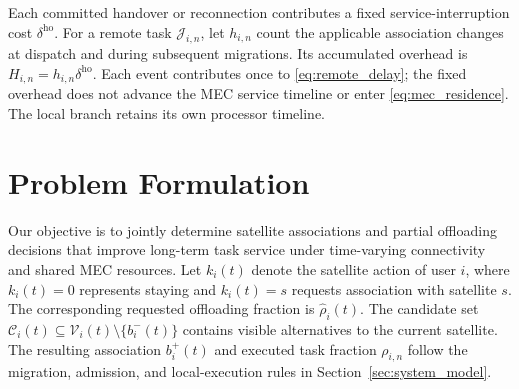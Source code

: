 \documentclass[journal]{IEEEtran}
\begin{document}
Each committed handover or reconnection contributes
a fixed service-interruption cost $\delta^{\mathrm{ho}}$.
For a remote task $\mathcal{J}_{i,n}$, let $h_{i,n}$
count the applicable association changes at dispatch
and during subsequent migrations. Its accumulated
overhead is $H_{i,n}=h_{i,n}\delta^{\mathrm{ho}}$.
Each event contributes once to \eqref{eq:remote_delay};
the fixed overhead does not advance the MEC service
timeline or enter \eqref{eq:mec_residence}.
The local branch retains its own processor timeline.

\section{Problem Formulation}
\label{sec:problem_formulation}

Our objective is to jointly determine satellite associations
and partial offloading decisions that improve long-term task
service under time-varying connectivity and shared MEC
resources. Let $k_i(t)$ denote the satellite action of user
$i$, where $k_i(t)=0$ represents staying and
$k_i(t)=s$ requests association with satellite $s$.
The corresponding requested offloading fraction is
$\widehat{\rho}_i(t)$.
The candidate set
$\mathcal{C}_i(t)\subseteq
\mathcal{V}_i(t)\setminus\{b_i^{-}(t)\}$
contains visible alternatives to the current satellite.
The resulting association $b_i^{+}(t)$ and executed task
fraction $\rho_{i,n}$ follow the migration, admission,
and local-execution rules in Section~\ref{sec:system_model}.
\end{document}
